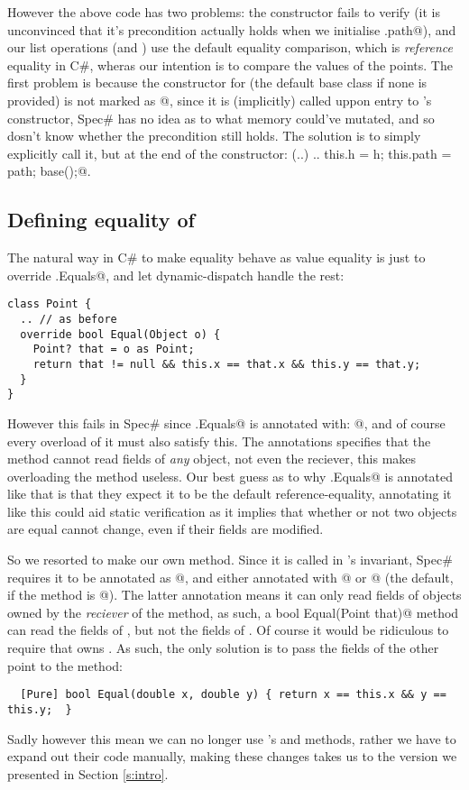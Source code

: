 However the above code has two problems: the constructor fails to verify (it is unconvinced that it's precondition actually holds when we initialise \Q@this.path@), and our list operations (\Q@Contains@ and \Q@IndexOf@) use the default equality comparison, which is \emph{reference} equality in C\#, wheras our intention is to compare the values of the points. 
The first problem is because the constructor for \Q@Object@ (the default base class if none is provided) is not marked as \Q@[Pure]@, since it is (implicitly) called uppon entry to \Q@Cage@'s constructor, Spec\# has no idea as to what memory could've mutated, and so dosn't know whether the precondition still holds. The solution is to simply explicitly call it, but at the end of the constructor: \Q@Cage(..) .. { this.h = h; this.path = path; base();}@.

\subsection{Defining equality of \Q@Point@s}
The natural way in C\# to make equality behave as value equality is just to override \Q@Object.Equals@, and let dynamic-dispatch handle the rest:
\begin{lstlisting}
class Point {
  .. // as before
  override bool Equal(Object o) {
    Point? that = o as Point;
    return that != null && this.x == that.x && this.y == that.y;
  }
}
\end{lstlisting}
However this fails in Spec\# since \Q@Object.Equals@ is annotated with: @, and of course every overload of it must also satisfy this. The \Q@Reads@ annotations specifies that the method cannot read fields of \emph{any} object, not even the reciever, this makes overloading the method useless. Our best guess as to why \Q@Object.Equals@ is annotated like that is that they expect it to be the default reference-equality, annotating it like this could aid static verification as it implies that whether or not two objects are equal cannot change, even if their fields are modified.

So we resorted to make our own \Q@Equal@ method. Since it is called in \Q@Cage@'s invariant, Spec\# requires it to be annotated as \Q@[Pure]@, and either annotated with @ or @ (the default, if the method is \Q@[Pure]@). The latter annotation means it can only read fields of objects owned by the \emph{reciever} of the method, as such, a \Q@[Pure] bool Equal(Point that)@ method can read the fields of \Q@this@, but not the fields of \Q@that@. Of course it would be ridiculous to require that \Q@this@ owns \Q@that@. As such, the only solution is to pass the fields of the other point to the method:
\begin{lstlisting}
  [Pure] bool Equal(double x, double y) { return x == this.x && y == this.y;  }
\end{lstlisting}

Sadly however this mean we can no longer use \Q@List@'s \Q@Contains@ and \Q@IndexOf@ methods, rather we have to expand out their code manually, making these changes takes us to the version we presented in Section \ref{s:intro}.


